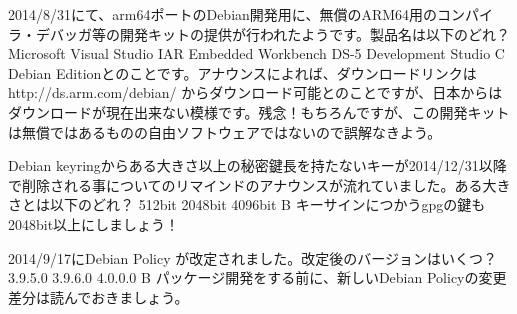 \santaku
{2014/8/31にて、arm64ポートのDebian開発用に、無償のARM64用のコンパイラ・デバッガ等の開発キットの提供が行われたようです。製品名は以下のどれ？}
{Microsoft Visual Studio}
{IAR Embedded Workbench}
{DS-5 Development Studio}
{C}
{ Debian Editionとのことです。アナウンスによれば、ダウンロードリンクは http://ds.arm.com/debian/ からダウンロード可能とのことですが、日本からはダウンロードが現在出来ない模様です。残念！もちろんですが、この開発キットは無償ではあるものの自由ソフトウェアではないので誤解なきよう。}

\santaku
{ Debian keyringからある大きさ以上の秘密鍵長を持たないキーが2014/12/31以降で削除される事についてのリマインドのアナウンスが流れていました。ある大きさとは以下のどれ？}
{ 512bit }
{ 2048bit }
{ 4096bit }
{B}
{ キーサインにつかうgpgの鍵も2048bit以上にしましょう！}

\santaku
{ 2014/9/17にDebian Policy が改定されました。改定後のバージョンはいくつ？}
{ 3.9.5.0 }
{ 3.9.6.0 }
{ 4.0.0.0 }
{B}
{ パッケージ開発をする前に、新しいDebian Policyの変更差分は読んでおきましょう。}
